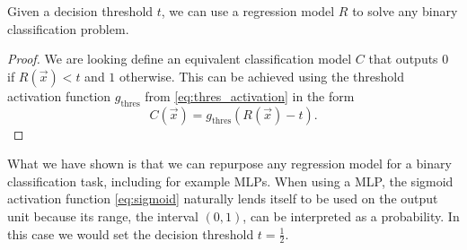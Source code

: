 \begin{lemma}
    Given a decision threshold $t$, we can use a regression model $R$ to solve any binary classification problem.
\end{lemma}
\begin{proof}
    We are looking define an equivalent classification model $C$ that outputs $0$ if $R\left(\vec{x}\right)<t$ and $1$ otherwise. 
    This can be achieved using the threshold activation function $g_\text{thres}$ from \ref{eq:thres_activation} in the form
    \begin{equation}
        C(\vec{x}) = g_\text{thres}\left(R\left(\vec{x}\right) - t\right).
    \end{equation}
\end{proof}
\begin{remark}
    What we have shown is that we can repurpose any regression model for a binary classification task, including for example MLPs.
    When using a MLP, the sigmoid activation function \ref{eq:sigmoid} naturally lends itself to be used on the output unit because its range, the interval $(0,1)$, can be interpreted as a probability.
    In this case we would set the decision threshold $t=\frac{1}{2}$.
\end{remark}

